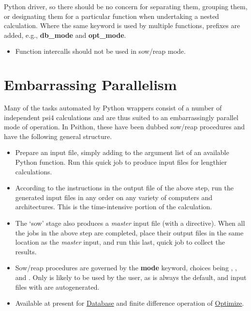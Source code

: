 \documentclass[letterpaper,10pt,english]{sphinxmanual}
\begin{document}
Python driver, so there should be no concern for separating them, grouping
them, or designating them for a particular function when undertaking a
nested calculation. Where the same keyword is used by multiple functions,
prefixes are added, e.g., \textbf{db\_mode} and \textbf{opt\_mode}.
\begin{itemize}
\item {} 
Function intercalls should not be used in sow/reap mode.

\end{itemize}


\chapter{Embarrassing Parallelism}
\label{index:embarrassing-parallelism}
Many of the tasks automated by Python wrappers consist of a number of
independent psi4 calculations and are thus suited to an embarrassingly
parallel mode of operation. In Psithon, these have been dubbed sow/reap
procedures and have the following general structure.
\begin{itemize}
\item {} 
Prepare an input file, simply adding  to the
argument list of an available Python function. Run this quick job to
produce input files for lengthier calculations.

\item {} 
According to the instructions in the output file of the above step,
run the generated input files in any order on any variety of computers
and architectures. This is the time-intensive portion of the
calculation.

\item {} 
The `sow' stage also produces a \emph{master} input file (with a
 directive). When all the jobs in the above step are
completed, place their output files in the same location as the
\emph{master} input, and run this last, quick job to collect the results.

\end{itemize}
\begin{itemize}
\item {} 
Sow/reap procedures are governed by the \textbf{mode} keyword, choices being
, , and . Only  is likely to
be used by the user, as  is always the default, and
input files with  are autogenerated.

\item {} 
Available at present for {\hyperref[index:database]{Database}} and finite difference operation of {\hyperref[index:optimize]{Optimize}}.

\end{itemize}
\end{document}
